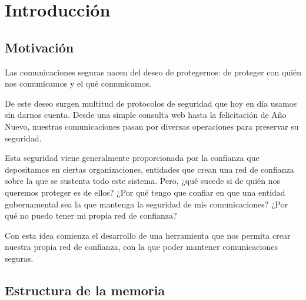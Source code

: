 
\chapter{Introducción} %

\label{Chapter1}


\newcommand{\keyword}[1]{\textbf{#1}}
\newcommand{\tabhead}[1]{\textbf{#1}}
\newcommand{\code}[1]{\texttt{#1}}
\newcommand{\file}[1]{\texttt{\bfseries#1}}
\newcommand{\option}[1]{\texttt{\itshape#1}}
\newcommand{\Mod}[1]{\ (\mathrm{mod}\ #1)}


\section{Motivación}

Las comunicaciones seguras nacen del deseo de protegernos: de proteger con quién
nos comunicamos y el qué comunicamos.

De este deseo surgen multitud de protocolos de seguridad que hoy en día usamos
sin darnos cuenta. Desde una simple consulta web hasta la felicitación de Año
Nuevo, nuestras comunicaciones pasan por diversas operaciones para preservar su
seguridad.

Esta seguridad viene generalmente proporcionada por la confianza que depositamos
en ciertas organizaciones, entidades que crean una red de confianza sobre la que
se sustenta todo este sistema. Pero, ¿qué sucede si de quién nos queremos
proteger es de ellos? ¿Por qué tengo que confiar en que una entidad
gubernamental sea la que mantenga la seguridad de mis comunicaciones? ¿Por qué
no puedo tener mi propia red de confianza?

Con esta idea comienza el desarrollo de una herramienta que nos permita crear
nuestra propia red de confianza, con la que poder mantener comunicaciones
seguras.


\section{Estructura de la memoria}

